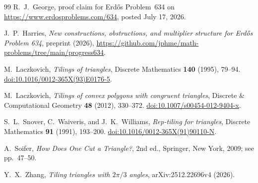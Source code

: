\documentclass[11pt]{amsart}
\theoremstyle{remark}
\begin{document}
\begin{thebibliography}{99}
R.~J.~George,
proof claim for Erd\H{o}s Problem~634 on \url{https://www.erdosproblems.com/634}, posted July 17, 2026.

J.~P.~Harries,
\emph{New constructions, obstructions, and multiplier structure for Erd\H{o}s Problem 634},
preprint (2026), \url{https://github.com/jphme/math-problems/tree/main/progress634}.

M.~Laczkovich,
\emph{Tilings of triangles},
Discrete Mathematics \textbf{140} (1995), 79--94.
\href{https://doi.org/10.1016/0012-365X(93)E0176-5}{doi:10.1016/0012-365X(93)E0176-5}.

M.~Laczkovich,
\emph{Tilings of convex polygons with congruent triangles},
Discrete \& Computational Geometry \textbf{48} (2012), 330--372.
\href{https://doi.org/10.1007/s00454-012-9404-x}{doi:10.1007/s00454-012-9404-x}.

S.~L.~Snover, C.~Waiveris, and J.~K.~Williams,
\emph{Rep-tiling for triangles},
Discrete Mathematics \textbf{91} (1991), 193--200.
\href{https://doi.org/10.1016/0012-365X(91)90110-N}{doi:10.1016/0012-365X(91)90110-N}.

A.~Soifer,
\emph{How Does One Cut a Triangle?},
2nd ed., Springer, New York, 2009; see pp.~47--50.

Y.~X.~Zhang,
\emph{Tiling triangles with $2\pi/3$ angles},
arXiv:2512.22696v4 (2026).

\end{thebibliography}
\end{document}
